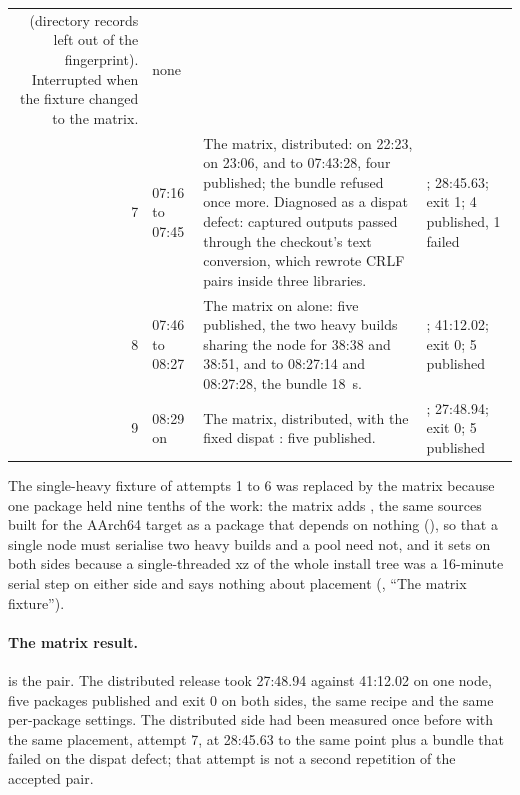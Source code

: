 \begin{table}[!htp]
\begin{tabular}{@{}rL{1.5cm}L{6.6cm}L{4.4cm}@{}}
(directory records left out of the fingerprint). Interrupted when the fixture
changed to the matrix. & none \\
7 & 07:16 to 07:45 & The matrix, distributed:  on  22:23,
 on  23:06,  and  to
07:43:28, four published; the bundle refused  once more. Diagnosed
as a dispat defect: captured outputs passed through the checkout's
 text conversion, which rewrote CRLF pairs inside three
libraries. & ; 28:45.63; exit 1; 4 published, 1 failed \\
8 & 07:46 to 08:27 & The matrix on  alone: five published, the two
heavy builds sharing the node for 38:38 and 38:51,  and 
to 08:27:14 and 08:27:28, the bundle 18~s. & ;
41:12.02; exit 0; 5 published \\
9 & 08:29 on & The matrix, distributed, with the fixed dispat
: five published. & ;
27:48.94; exit 0; 5 published \\
\bottomrule
\end{tabular}
\end{table}

The single-heavy fixture of attempts 1 to 6 was replaced by the matrix because
one package held nine tenths of the work: the matrix adds
, the same sources built for the AArch64 target as a package
that depends on nothing (), so
that a single node must serialise two heavy builds and a pool need not, and
it sets  on both sides because a
single-threaded xz of the whole install tree was a 16-minute serial step on
either side and says nothing about placement (, ``The matrix
fixture'').

\paragraph{The matrix result.}
 is the pair. The distributed release took 27:48.94
against 41:12.02 on one node, five packages published and exit 0 on both
sides, the same recipe and the same per-package settings. The distributed
side had been measured once before with the same placement, attempt 7, at
28:45.63 to the same point plus a bundle that failed on the dispat defect;
that attempt is not a second repetition of the accepted pair.

